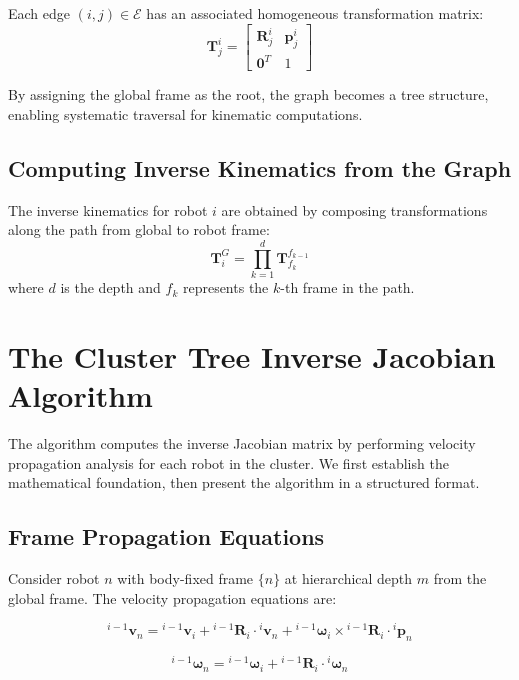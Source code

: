 \documentclass[lettersize,journal]{IEEEtran}
\begin{document}
Each edge $(i,j) \in \mathcal{E}$ has an associated homogeneous transformation matrix:
\begin{equation}
\mathbf{T}_j^i = \begin{bmatrix}
\mathbf{R}_j^i & \mathbf{p}_j^i \\
\mathbf{0}^T & 1
\end{bmatrix}
\end{equation}

By assigning the global frame as the root, the graph becomes a tree structure, enabling systematic traversal for kinematic computations.

\subsection{Computing Inverse Kinematics from the Graph}

The inverse kinematics for robot $i$ are obtained by composing transformations along the path from global to robot frame:
\begin{equation}
\mathbf{T}_i^G = \prod_{k=1}^{d} \mathbf{T}_{f_k}^{f_{k-1}}
\end{equation}
where $d$ is the depth and $f_k$ represents the $k$-th frame in the path.

\section{The Cluster Tree Inverse Jacobian Algorithm}

The algorithm computes the inverse Jacobian matrix by performing velocity propagation analysis for each robot in the cluster. We first establish the mathematical foundation, then present the algorithm in a structured format.

\subsection{Frame Propagation Equations}

Consider robot $n$ with body-fixed frame $\{n\}$ at hierarchical depth $m$ from the global frame. The velocity propagation equations are:

\begin{equation}
{}^{i-1}\mathbf{v}_n = {}^{i-1}\mathbf{v}_i + {}^{i-1}\mathbf{R}_i \cdot {}^i\mathbf{v}_n + {}^{i-1}\boldsymbol{\omega}_i \times {}^{i-1}\mathbf{R}_i \cdot {}^i\mathbf{p}_n
\end{equation}

\begin{equation}
{}^{i-1}\boldsymbol{\omega}_n = {}^{i-1}\boldsymbol{\omega}_i + {}^{i-1}\mathbf{R}_i \cdot {}^i\boldsymbol{\omega}_n
\end{equation}
\end{document}
